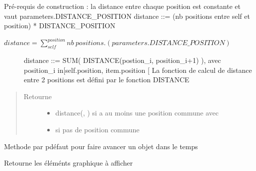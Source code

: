 \documentclass[a4paper,10pt,french]{sphinxmanual}
\begin{document}
\begin{fulllineitems}
\begin{fulllineitems}
Pré-requis de construction : la distance entre chaque position est constante et vaut parameters.DISTANCE\_POSITION
distance ::=  (nb positions entre self et position) * DISTANCE\_POSITION

\(distance = \sum_{self}^{position}{nb\ positions}.(parameters.DISTANCE\_POSITION)\)
\begin{description}
\item[{}] \leavevmode
distance ::= SUM( DISTANCE(postion\_i, position\_i+1) ), avec position\_i in{[}self.position, item.position {[}
La fonction de calcul de distance entre 2 positions est défini par le fonction DISTANCE

\end{description}
\begin{quote}\begin{description}
\item[{Retourne}] \leavevmode
\begin{itemize}
\item {} 
distance(, ) si  a au moins une position commune avec 

\item {} 
 si pas de position commune

\end{itemize}


\end{description}\end{quote}

\end{fulllineitems}


\begin{fulllineitems}
\label{\detokenize{road_objects/road_item:road_objects.road_item.RoadItem.forward}}
Methode par pdéfaut pour faire avancer un objet dans le temps

\end{fulllineitems}


\begin{fulllineitems}
\label{\detokenize{road_objects/road_item:road_objects.road_item.RoadItem.get_plot}}
Retourne les éléménts graphique à afficher


\end{fulllineitems}
\end{fulllineitems}
\end{document}
